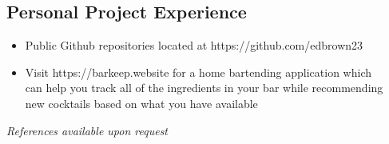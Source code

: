 \documentclass[line,margin]{res}
\begin{document}
\begin{resume}
         
    \section{Personal Project Experience}
        \begin{itemize} \itemsep -2pt
            \item Public Github repositories located at https://github.com/edbrown23 
            \item Visit https://barkeep.website for a home bartending application which \\
                  can help you track all of the ingredients in your bar while recommending \\
                  new cocktails based on what you have available
        \end{itemize}
            
    {\sl References available upon request}
    \end{resume}
\end{document}

